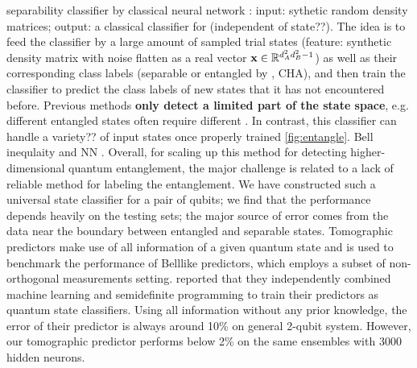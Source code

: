 \documentclass[
aps,
pra,
floatfix,
]{revtex4-2}
\theoremstyle{plain}
\theoremstyle{definition}
\begin{document}
separability classifier by classical neural network \cite{luSeparabilityEntanglementClassifierMachine2018}:
input: sythetic random density matrices;
output: a classical classifier for  (independent of state??).
The idea is to feed the classifier by a large amount of sampled trial states (feature: synthetic density matrix with noise flatten as a real vector $\vb{x}\in\mathbb{R}^{d_A^2d_B^2-1}$) as well as their corresponding class labels (separable or entangled by , CHA), and then train the classifier to predict the class labels of new states that it has not encountered before.
Previous methods \textbf{only detect a limited part of the state space}, e.g. different entangled states often require different . In contrast, this classifier can handle a variety?? of input states once properly trained \cref{fig:entangle}.
Bell inequlaity and NN \cite{maTransformingBellInequalities2018}. 
Overall, for scaling up this method for detecting higher-dimensional quantum entanglement, the major challenge is related to a lack of reliable method for labeling the entanglement.
We have constructed such a universal state classiﬁer for a pair of qubits; we ﬁnd that the performance depends heavily on the testing sets; the major source of error comes from the data near the boundary between entangled and separable states.
Tomographic predictors make use of all information of a given quantum state and is used to benchmark the performance of Belllike predictors, which employs a subset of non-orthogonal measurements setting.
\cite{luSeparabilityEntanglementClassifierMachine2018} reported that they independently combined machine learning and semideﬁnite programming to train their predictors as quantum state classiﬁers. Using all information without any prior knowledge, the error of their predictor is always around 10\% on general 2-qubit system. However, our tomographic predictor performs below 2\% on the same ensembles with 3000 hidden neurons.
\end{document}
